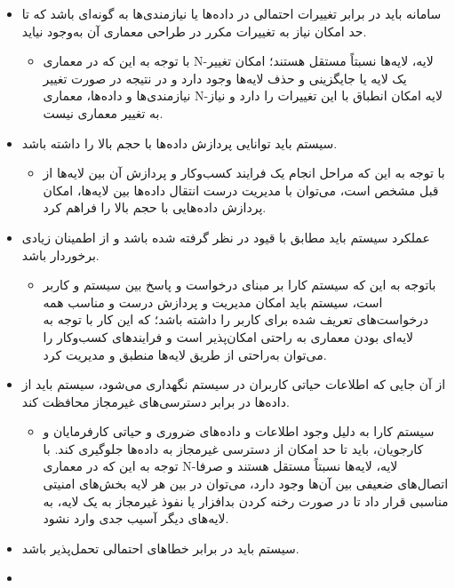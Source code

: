\documentclass[12pt]{article}
\begin{document}
	\begin{itemize}
		\item
		سامانه باید در برابر تغییرات احتمالی در داده‌ها یا نیازمندی‌ها به گونه‌ای باشد که تا حد امکان نیاز به تغییرات مکرر در طراحی معماری آن به‌وجود نیاید.
		\begin{itemize}
			\item
			با توجه به این که در معماری N-لایه، لایه‌ها نسبتاً مستقل هستند؛ امکان تغییر یک لایه یا جایگزینی و حذف لایه‌ها وجود دارد و در نتیجه در صورت تغییر نیازمندی‌ها و داده‌ها، معماری N-لایه امکان انطباق با این تغییرات را دارد و نیاز به تغییر معماری نیست.
		\end{itemize}
		\item
		سیستم باید توانایی پردازش داده‌ها با حجم بالا را داشته باشد.
		\begin{itemize}
			\item
			با توجه به این که مراحل انجام یک فرایند کسب‌و‌کار و پردازش آن بین لایه‌ها از قبل مشخص است، می‌توان با مدیریت درست انتقال داده‌ها بین لایه‌ها، امکان پردازش داده‌هایی با حجم بالا را فراهم کرد.
		\end{itemize}
		\item
		عملکرد سیستم باید مطابق با قیود در نظر گرفته شده باشد و از اطمینان زیادی برخوردار باشد.
		\begin{itemize}
			\item
			با‌توجه به این که سیستم کارا بر مبنای درخواست و پاسخ بین سیستم و کاربر است، سیستم باید امکان مدیریت و پردازش درست و مناسب همه درخواست‌های تعریف شده برای کاربر را داشته باشد؛ که این کار با توجه به لایه‌ای بودن معماری به راحتی امکان‌پذیر است و فرایندهای کسب‌و‌کار را می‌توان به‌راحتی از طریق لایه‌ها منطبق و مدیریت کرد.
		\end{itemize}
		\item
		از آن جایی که اطلاعات حیاتی کاربران در سیستم نگهداری می‌شود، سیستم باید از داده‌ها در برابر دسترسی‌های غیرمجاز محافظت کند.
		\begin{itemize}
			\item سیستم کارا به دلیل وجود اطلاعات و داده‌های ضروری و حیاتی کارفرمایان و کارجویان، باید تا حد امکان از دسترسی غیرمجاز به داده‌ها جلوگیری کند. با توجه به این که در معماری N-لایه، لایه‌ها نسبتاً مستقل هستند و صرفا اتصال‌های ضعیفی بین آن‌ها وجود دارد، می‌توان در بین هر لایه بخش‌های امنیتی مناسبی قرار داد تا در صورت رخنه کردن بد‌افزار یا نفوذ غیرمجاز به یک لایه، به لایه‌های دیگر آسیب جدی وارد نشود.
		\end{itemize}
		\item
		سیستم باید در برابر خطاهای احتمالی تحمل‌پذیر باشد.
		\item

\end{itemize}
\end{document}
